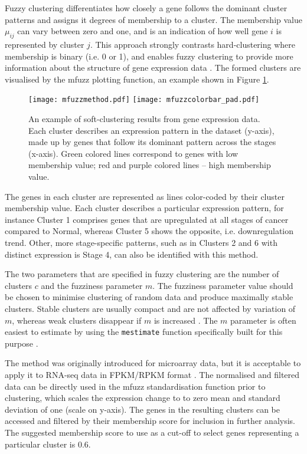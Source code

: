 Fuzzy clustering differentiates how closely a gene follows the dominant cluster patterns and assigns it degrees of membership to a cluster. The membership value $\mu_{ij}$ can vary between zero and one, and is an indication of how well gene $i$ is represented by cluster $j$. This approach strongly contrasts hard-clustering where membership is binary (i.e. 0 or 1), and enables fuzzy clustering to provide more information about the structure of gene expression data \cite{Kumar2007Mfuzz:Data}. 
The formed clusters are visualised by the mfuzz plotting function, an example shown in Figure \ref{fig:mfuzzmethod}. 

        \begin{figure}[!h]
        \texttt{[image: mfuzzmethod.pdf]}\hfill
        \texttt{[image: mfuzzcolorbar\_pad.pdf]}
        \caption{An example of soft-clustering results from gene expression data. Each cluster describes an expression pattern in the dataset (y-axis), made up by genes that follow its dominant pattern across the stages (x-axis).  Green colored lines correspond to genes with low membership value; red and purple colored lines -- high membership value.}
        \label{fig:mfuzzmethod}
        \end{figure}
            
 The genes in each cluster are represented as lines color-coded by their cluster membership value.  Each cluster describes a particular expression pattern, for instance Cluster 1 comprises genes that are upregulated at all stages of cancer compared to Normal, whereas Cluster 5 shows the opposite, i.e. downregulation trend. Other, more stage-specific patterns, such as in Clusters 2 and 6 with distinct expression is Stage 4, can also be identified with this method. 
 
  
The two parameters that are specified in fuzzy clustering are the number of clusters $c$ and the fuzziness parameter $m$. The fuzziness parameter value should be chosen to minimise clustering of random data and produce maximally stable clusters. Stable clusters are usually compact and are not affected by variation of $m$, whereas weak clusters disappear if $m$ is increased \cite{Kumar2007Mfuzz:Data}. The $m$ parameter is often easiest to estimate by using the \texttt{mestimate} function specifically built for this purpose \cite{Schwammle2010AAnalysis}. 
 
  
 
The method was originally introduced for microarray data, but it is acceptable to apply it to RNA-seq data in FPKM/RPKM format \cite{Futschik2007MfuzzHomepage}.  The normalised and filtered data can be directly used in the mfuzz standardisation function prior to clustering, which scales the expression change to to zero mean and standard deviation of one (scale on y-axis).
The genes in the resulting clusters can be accessed and filtered by their membership score for inclusion in further analysis. The suggested membership score to use as a cut-off to select genes representing a particular cluster is 0.6. 


